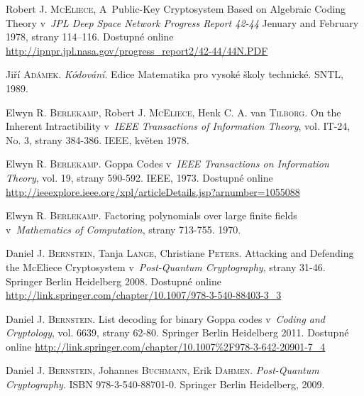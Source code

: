 \documentclass[thesis=M,czech,hidelinks]{FITthesis}[2012/06/26]
\newcommand{\0}{{\textcolor[gray]{0.75}{0}}}
\begin{document}

%
%
\begin{thebibliography}{99}

        Robert J. \textsc{McEliece}, A~Public-Key Cryptosystem Based on
        Algebraic Coding Theory v~\emph{JPL Deep Space Network Progress Report
        42-44} Jenuary and February 1978, strany 114–116. Dostupné online
        \url{http://ipnpr.jpl.nasa.gov/progress_report2/42-44/44N.PDF}

        Jiří \textsc{Adámek}. \emph{Kódování}. Edice Matematika pro vysoké školy
        technické. SNTL, 1989.

        Elwyn R. \textsc{Berlekamp}, Robert J. \textsc{McEliece}, Henk C. A. van
        \textsc{Tilborg}.  On the Inherent Intractibility v~\emph{IEEE
        Transactions of Information Theory}, vol. IT-24, No. 3, strany 384-386.
        IEEE, květen 1978.

        Elwyn R. \textsc{Berlekamp}. Goppa Codes v~\emph{IEEE Transactions on
        Information Theory}, vol. 19, strany 590-592. IEEE, 1973. Dostupné
        online
        \url{http://ieeexplore.ieee.org/xpl/articleDetails.jsp?arnumber=1055088}

        Elwyn R. \textsc{Berlekamp}. Factoring polynomials over large finite
        fields v~\emph{Mathematics of Computation}, strany 713-755. 1970.

        Daniel J. \textsc{Bernstein}, Tanja \textsc{Lange}, Christiane
        \textsc{Peters}. Attacking and Defending the McEliece Cryptosystem
        v~\emph{Post-Quantum Cryptography}, strany 31-46. Springer Berlin
        Heidelberg 2008. Dostupné online
        \url{http://link.springer.com/chapter/10.1007/978-3-540-88403-3\_3}

        Daniel J. \textsc{Bernstein}. List decoding for binary Goppa codes
        v~\emph{Coding and Cryptology}, vol. 6639, strany 62-80. Springer Berlin
        Heidelberg 2011. Dostupné online
        \url{http://link.springer.com/chapter/10.1007\%2F978-3-642-20901-7\_4}

        Daniel J. \textsc{Bernstein}, Johannes \textsc{Buchmann}, Erik
        \textsc{Dahmen}. \emph{Post-Quantum Cryptography}. ISBN
        978-3-540-88701-0.  Springer Berlin Heidelberg, 2009.


\end{thebibliography}
\end{document}

